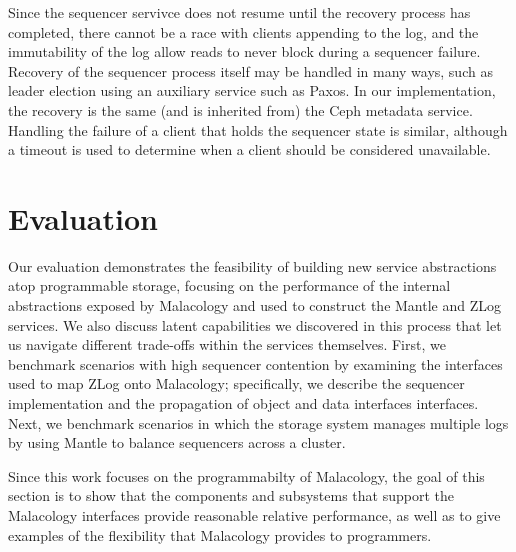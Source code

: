 \documentclass[preprint]{sigplanconf-eurosys}
\begin{document}
Since the sequencer servivce does not resume until the recovery process has
completed, there cannot be a race with clients appending to the log, and the
immutability of the log allow reads to never block during a sequencer failure.
Recovery of the sequencer process itself may be handled in many ways, such as
leader election using an auxiliary service such as Paxos. In our
implementation, the recovery is the same (and is inherited from) the Ceph
metadata service. Handling the failure of a client that holds the sequencer
state is similar, although a timeout is used to determine when a client should
be considered unavailable.

\section{Evaluation}
\label{sec:evaluation} 


Our evaluation demonstrates the feasibility of building new service
abstractions atop programmable storage, focusing on the performance of the
internal abstractions exposed by Malacology and used to construct the Mantle
and ZLog services. We also discuss latent capabilities we discovered in this
process that let us navigate different trade-offs within the services
themselves. First, we benchmark scenarios with high sequencer contention by
examining the interfaces used to map ZLog onto Malacology; specifically, we
describe the sequencer implementation and the propagation of object and data
interfaces interfaces.  Next, we benchmark scenarios in which the storage
system manages multiple logs by using Mantle to balance sequencers across a
cluster.


Since this work focuses on the programmabilty of Malacology, the goal of this
section is to show that the components and subsystems that support the
Malacology interfaces provide reasonable relative performance, as well as to
give examples of the flexibility that Malacology provides to programmers.
\end{document}
